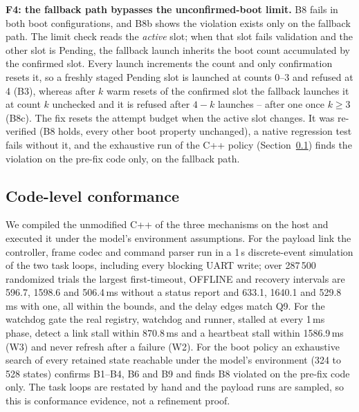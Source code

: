 \documentclass[conference,a4paper]{IEEEtran}
\newif\ifrerunmarks
\DeclareRobustCommand{\rerun}[1]{\ifrerunmarks\textcolor{red}{#1}\else#1\fi}
\begin{document}
\textbf{F4: the fallback path bypasses the unconfirmed-boot limit.} B8 fails in both boot configurations, and B8b shows the violation exists only on the fallback path. The limit check reads the \emph{active} slot; when that slot fails validation and the other slot is Pending, the fallback launch inherits the boot count accumulated by the confirmed slot. Every launch increments the count and only confirmation resets it, so a freshly staged Pending slot is launched at counts 0--3 and refused at 4 (B3), whereas after $k$ warm resets of the confirmed slot the fallback launches it at count $k$ unchecked and it is refused after $4-k$ launches -- after one once $k\ge3$ (B8c). The fix resets the attempt budget when the active slot changes. It was re-verified (B8 holds, every other boot property unchanged), a native regression test fails without it, and the exhaustive run of the C++ policy (Section~\ref{sec:code}) finds the violation on the pre-fix code only, on the fallback path.

\subsection{Code-level conformance}
\label{sec:code}
We compiled the unmodified C++ of the three mechanisms on the host and executed it under the model's environment assumptions. For the payload link the controller, frame codec and command parser run in a 1\,\textmu s discrete-event simulation of the two task loops, including every blocking UART write; \rerun{over 287\,500 randomized trials the largest first-timeout, OFFLINE and recovery intervals are 596.7, 1598.6 and 506.4\,ms without a status report and 633.1, 1640.1 and 529.8\,ms with one, all within the bounds, and the delay edges match Q9}. For the watchdog gate the real registry, watchdog and runner, stalled at every 1\,ms phase, detect a link stall within \rerun{870.8\,ms} and a heartbeat stall within \rerun{1586.9\,ms} (W3) and never refresh after a failure (W2). For the boot policy an exhaustive search of every retained state reachable under the model's environment (324 to 528 states) confirms B1--B4, B6 and B9 and finds B8 violated on the pre-fix code only. The task loops are restated by hand and the payload runs are sampled, so this is conformance evidence, not a refinement proof.
\end{document}
